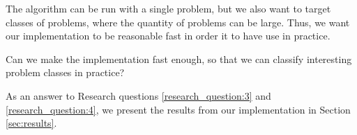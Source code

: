 The algorithm can be run with a single problem, but we also want to target classes of problems, where the quantity of problems can be large.
Thus, we want our implementation to be reasonable fast in order it to have use in practice.
\begin{researchquestion} \label{research_question:4}
Can we make the implementation fast enough, so that we can classify interesting problem classes in practice?
\end{researchquestion}

As an answer to Research questions \ref{research_question:3} and \ref{research_question:4}, we present the results from our implementation in Section \ref{sec:results}.
